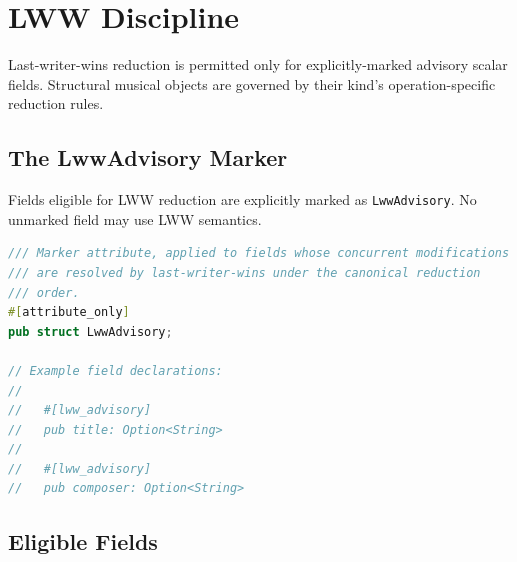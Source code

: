 \documentclass[11pt,letterpaper]{report}
\begin{document}
\section{LWW Discipline}
\label{sec:semops:lww}

Last-writer-wins reduction is permitted only for explicitly-marked
advisory scalar fields. Structural musical objects are governed by
their kind's operation-specific reduction rules.

\subsection{The LwwAdvisory Marker}

Fields eligible for LWW reduction are explicitly marked as
\texttt{LwwAdvisory}. No unmarked field may use LWW semantics.

\begin{lstlisting}[language=Rust]
/// Marker attribute, applied to fields whose concurrent modifications
/// are resolved by last-writer-wins under the canonical reduction
/// order.
#[attribute_only]
pub struct LwwAdvisory;

// Example field declarations:
//
//   #[lww_advisory]
//   pub title: Option<String>
//
//   #[lww_advisory]
//   pub composer: Option<String>
\end{lstlisting}

\subsection{Eligible Fields}
\end{document}
